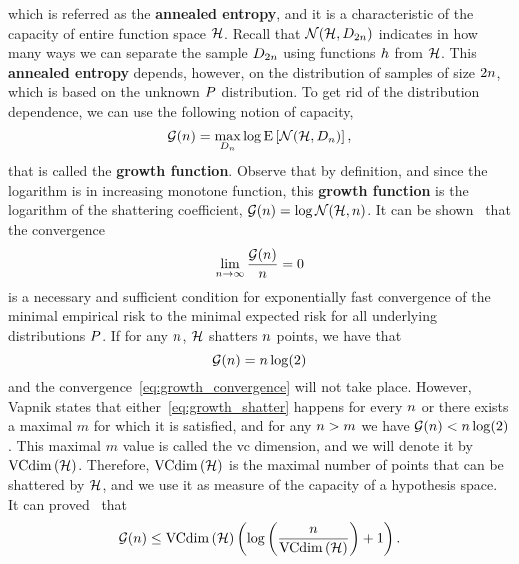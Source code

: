 which is referred as the \textbf{annealed entropy}, and it is a characteristic of the capacity of entire function space $\mathcal{H}$. Recall that $\mathcal{N}(\mathcal{H}, D_{2 n})$ indicates in how many ways we can separate the sample $D_{2 n}$ using functions $h$ from $\mathcal{H}$.
%
This \textbf{annealed entropy} depends, however, on the distribution of samples of size $2 n$, which is based on the unknown $P$ distribution. To get rid of the distribution dependence, we can use the following notion of capacity,
\begin{equation}
    \nonumber
    \mathcal{G}(n) = \max_{D_n} \log \operatorname{E}\left[\mathcal{N}(\mathcal{H}, D_{n})\right] , 
\end{equation}
that is called the \textbf{growth function}. Observe that by definition, and since the logarithm is in increasing monotone function, this \textbf{growth function} is the logarithm of the shattering coefficient, $\mathcal{G}(n) = \log \mathcal{N}(\mathcal{H}, n)$.
%
It can be shown~\citep{Vapnik00} that the convergence 
\begin{equation}
    \label{eq:growth_convergence}
    \lim_{\nsamples \to \infty} \frac{\mathcal{G}(\nsamples)}{\nsamples} = 0
\end{equation} 
is a necessary and sufficient condition for exponentially fast convergence of the minimal empirical risk to the minimal expected risk for all underlying distributions $P$.
%
If for any $n$,  $\mathcal{H}$ shatters $n$ points, we have that 
\begin{equation}
    \label{eq:growth_shatter}
    \mathcal{G}(\nsamples) = \nsamples \log(2)
\end{equation}
and the convergence~\eqref{eq:growth_convergence} will not take place.
However, Vapnik states that either~\eqref{eq:growth_shatter} happens for every $n$ or there exists a maximal $m$ for which it is satisfied, and for any $n > m$ we have $\mathcal{G}(n) < n \log(2)$. This maximal $m$ value is called the \acrfull{vc} dimension, and we will denote it by $\operatorname{VCdim}\left(\mathcal{H}\right)$. Therefore, $\operatorname{VCdim}\left(\mathcal{H}\right)$ is the maximal number of points that can be shattered by $\mathcal{H}$, and we use it as measure of the capacity of a hypothesis space. It can proved~\citep{Vapnik00} that 
\begin{equation}
    \label{eq:vcdim_ineq}
    \mathcal{G}(\nsamples) \leq \vcdim{\hypspace} \left(\log\left(\frac{\nsamples}{\vcdim{\hypspace}}\right) + 1 \right) .
\end{equation}
